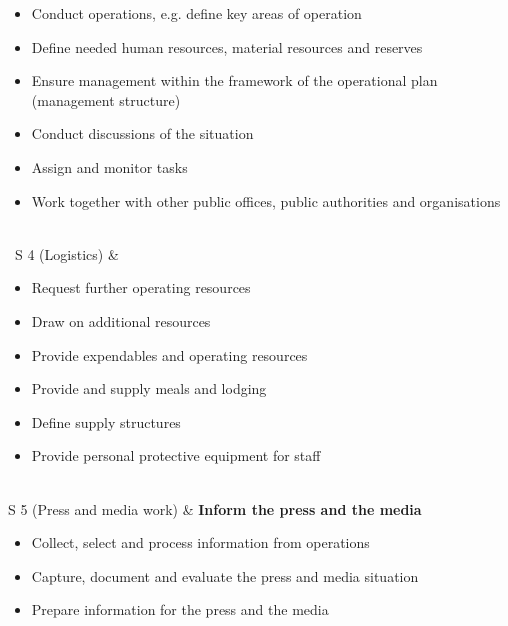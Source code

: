\documentclass{article}
\begin{document}
\begin{tabu}
\begin{itemize}
\item Conduct operations, e.g. define key areas of operation


\item Define needed human resources, material resources and reserves


\item Ensure management within the framework of the operational plan (management structure)


\item Conduct discussions of the situation


\item Assign and monitor tasks


\item Work together with other public offices, public authorities and organisations


\end{itemize} \\


 S 4 (Logistics)
 & 
\begin{itemize}
\item Request further operating resources


\item Draw on additional resources


\item Provide expendables and operating resources


\item Provide and supply meals and lodging


\item Define supply structures


\item Provide personal protective equipment for staff


\end{itemize} \\


S 5 (Press and media work) & \textbf{Inform the press and the media}

\begin{itemize}
\item Collect, select and process information from operations


\item Capture, document and evaluate the press and media situation


\item Prepare information for the press and the media


\end{itemize}


\end{tabu}
\end{document}
